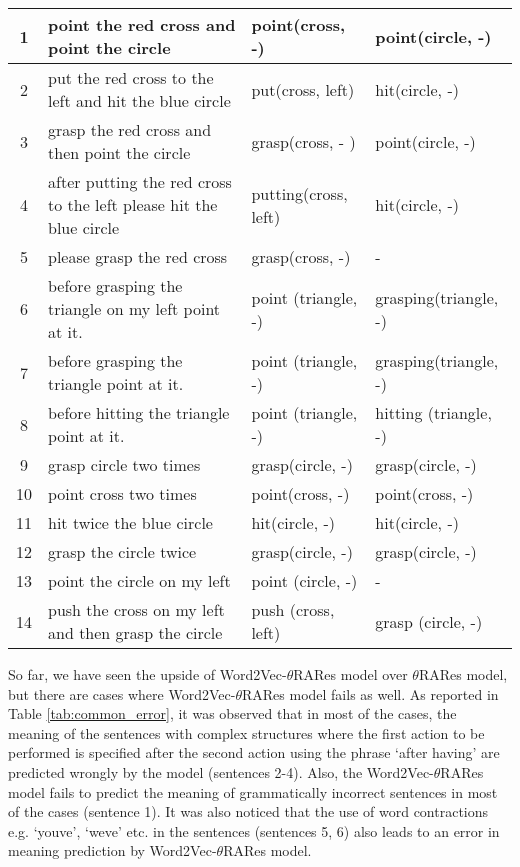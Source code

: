 \begin{table}[hbtp]
{\begin{tabular}{|c|l|l|l|}
1&point the red cross and point the circle                           & point(cross, -)         & point(circle, -)     \\ \hline
2&put the red cross to the left and hit the blue circle              & put(cross, left)        & hit(circle, -)     \\ \hline
3&grasp the red cross and then point the circle                      & grasp(cross, - )        & point(circle, -)     \\ \hline
4&after putting the red cross to the left please hit the blue circle & putting(cross, left)    & hit(circle, -)     \\ \hline
5&please grasp the red cross                                           & grasp(cross, -)         &    -                \\ \hline
6&before grasping the triangle on my left point at it.     & point (triangle, -)  & grasping(triangle, -)   \\ \hline
7&before grasping the triangle point at it.                & point (triangle, -)  & grasping(triangle, -)   \\ \hline
8&before hitting the triangle point at it.                 & point (triangle, -)  & hitting (triangle, -)   \\ \hline
9&grasp circle two times                                     & grasp(circle, -)         & grasp(circle, -)          \\ \hline
10&point cross two times                                     & point(cross, -)         & point(cross, -)         \\ \hline
11&hit twice the blue circle                                 & hit(circle, -)         & hit(circle, -)         \\ \hline
12&grasp the circle twice                                     & grasp(circle, -)         & grasp(circle, -)           \\ \hline
13&point the circle on my left                              & point (circle, -)    & -                        \\ \hline
14&push the cross on my left and then grasp the circle      & push (cross, left)   & grasp (circle, -)     \\ \hline

\end{tabular}%
}
\end{table} 

So far, we have seen the upside of Word2Vec-$\theta$RARes model over $\theta$RARes model, but there are cases where Word2Vec-$\theta$RARes model fails as well. As reported in Table \ref{tab:common_error}, it was observed that in most of the cases, the meaning of the sentences with complex structures where the first action to be performed is specified after the second action using the phrase `after having' are predicted wrongly by the model (sentences 2-4). Also, the Word2Vec-$\theta$RARes model fails to predict the meaning of grammatically incorrect sentences in most of the cases (sentence 1). It was also noticed that the use of word contractions e.g. `youve', `weve' etc. in the sentences (sentences 5, 6) also leads to an error in meaning prediction by Word2Vec-$\theta$RARes model.

